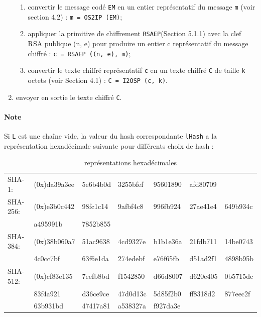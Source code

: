 \begin{enumerate}
\begin{enumerate}
\item convertir le message codé \texttt{EM} en un entier représentatif du message \texttt{m} (voir section 4.2) : \texttt{m = OS2IP (EM)};
\item appliquer la primitive de chiffrement \texttt{RSAEP}(Section 5.1.1) avec la clef RSA publique (n, e) pour produire un entier c représentatif du message chiffré : \texttt{c = RSAEP ((n, e), m)};
\item convertir le texte chiffré représentatif \texttt{c} en un texte chiffré \texttt{C} de taille \texttt{k} octets (voir Section 4.1) : \texttt{C = I2OSP (c, k)}.\\
\end{enumerate}
\item envoyer en sortie le texte chiffré \texttt{C}.\\
\end{enumerate}
\paragraph{Note} Si \texttt{L} est une chaîne vide, la valeur du hash correspondante \texttt{lHash} a la représentation hexadécimale suivante pour différents choix de hash :


\begin{table}[H]
\centering
\begin{tabularx}{17cm}{Xllllll}
SHA-1: & (0x)da39a3ee & 5e6b4b0d & 3255bfef & 95601890 & afd80709 & \\
SHA-256: & (0x)e3b0c442 & 98fc1c14 & 9afbf4c8 & 996fb924 & 27ae41e4 & 649b934c\\
& a495991b & 7852b855 & & & &\\
SHA-384: & (0x)38b060a7 & 51ac9638 & 4cd9327e & b1b1e36a & 21fdb711 & 14be0743\\
& 4c0cc7bf & 63f6e1da & 274edebf & e76f65fb & d51ad2f1 & 4898b95b\\
SHA-512: & (0x)cf83e135 & 7eefb8bd & f1542850 & d66d8007 & d620e405 & 0b5715dc\\
& 83f4a921 & d36ce9ce & 47d0d13c & 5d85f2b0 & ff8318d2 & 877eec2f\\
& 63b931bd & 47417a81 & a538327a & f927da3e &	&\\
\end{tabularx}
\caption{représentations hexadécimales}
\label{repres_hexa}
\end{table}

